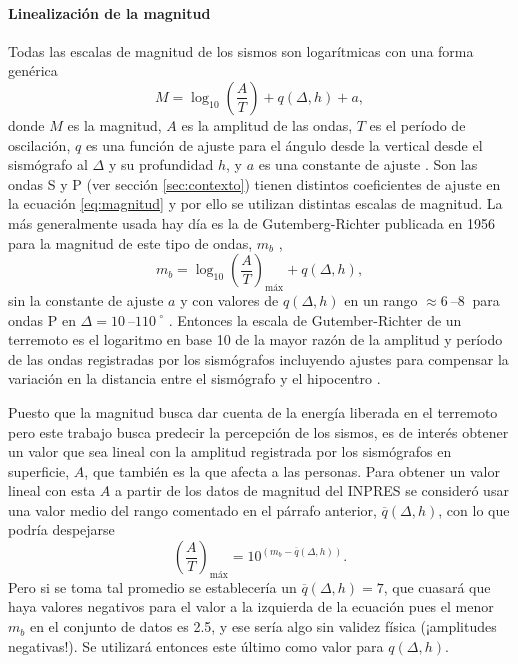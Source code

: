 \documentclass[a4paper]{report}
\begin{document}
\paragraph{Linealización de la magnitud}
Todas las escalas de magnitud de los sismos son logarítmicas con una forma genérica
\begin{equation}
	M = \log_{10} \left( \frac{A}{T} \right) + q(\Delta, h) + a,
	\label{eq:magnitud}
\end{equation}
donde \(M\) es la magnitud, \(A\) es la amplitud de las ondas, \(T\) es el período de oscilación, \(q\) es una función de ajuste para el ángulo desde la vertical desde el sismógrafo al \(\Delta\) y su profundidad \(h\), y \(a\) es una constante de ajuste \cite[ecuación 4.13]{fowler_solid_1990}.
Son las ondas S y P (ver sección \ref{sec:contexto}) tienen distintos coeficientes de ajuste en la ecuación \ref{eq:magnitud} y por ello se utilizan distintas escalas de magnitud.
La más generalmente usada hay día es la de Gutemberg-Richter publicada en 1956 para la magnitud de este tipo de ondas, \(m_b\) ,
\begin{equation}
	m_b = \log_{10} \left( \frac{A}{T} \right)_\text{máx} + q(\Delta, h),
	\label{eq:richter}
\end{equation}
sin la constante de ajuste \(a\) y con valores de \(q(\Delta, h)\) en un rango \(\approx \SIrange{6}{8}{}\)  para ondas P en \(\Delta = \SIrange{10}{110}{} ^\circ\) \cite[ecuación 4.18]{fowler_solid_1990}.
Entonces la escala de Gutember-Richter de un terremoto es el logaritmo en base \num{10} de la mayor razón de la amplitud y período de las ondas registradas por los sismógrafos incluyendo ajustes para compensar la variación en la distancia entre el sismógrafo y el hipocentro \cite{willian_l_ellsworth_earthquake_1991}.

Puesto que la magnitud busca dar cuenta de la energía liberada en el terremoto pero este trabajo busca predecir la percepción de los sismos, es de interés obtener un valor que sea lineal con la amplitud registrada por los sismógrafos en superficie, \(A\), que también es la que afecta a las personas. 
Para obtener un valor lineal con esta \(A\) a partir de los datos de magnitud del INPRES se consideró usar una valor medio del rango comentado en el párrafo anterior, \(\overline{q}(\Delta,h)\), con lo que podría despejarse
\begin{equation}
	\left( \frac{A}{T} \right)_\text{máx} = 10^{(m_b - \overline{q}(\Delta,h) )}.
	\label{eq:linealizacionMagnitud}
\end{equation}
Pero si se toma tal promedio se establecería un \(\overline{q}(\Delta,h) = 7\), que cuasará que haya valores negativos para el valor a la izquierda de la ecuación pues el menor \(m_b\) en el conjunto de datos es \num{2.5}, y ese sería algo sin validez física (¡amplitudes negativas!).
Se utilizará entonces este último como valor para \(q(\Delta,h)\).  
\end{document}
